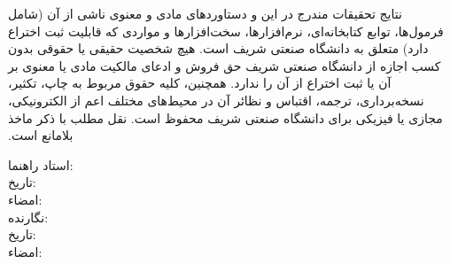 {\begin{multicols}{3}
\end{multicols}

‫نتایج تحقیقات مندرج در این \ThesisType{} و دستاوردهای مادی و معنوی ناشی از آن (شامل فرمول‌ها، توابع کتابخانه‌ای، نرم‌افزارها، سخت‌افزارها و مواردی که قابلیت ثبت اختراع دارد) متعلق به دانشگاه صنعتی شریف است. هیچ شخصیت حقیقی یا حقوقی بدون کسب اجازه از دانشگاه صنعتی شریف حق فروش و ادعای مالکیت مادی یا معنوی بر آن یا ثبت اختراع از آن را ندارد. همچنین، کلیه حقوق مربوط به چاپ، تکثیر، نسخه‌برداری، ترجمه، اقتباس و نظائر آن در محیط‌های مختلف اعم از الکترونیکی، مجازی یا فیزیکی برای دانشگاه صنعتی شریف محفوظ است. نقل مطلب با ذکر ماخذ بلامانع است.
‫

\begin{multicols}{2}
استاد راهنما: \ThesisSupervisor \\
تاریخ: \\
امضاء: \\

نگارنده: \ThesisAuthor\\
تاریخ: \\
امضاء: \\
\end{multicols}
}

